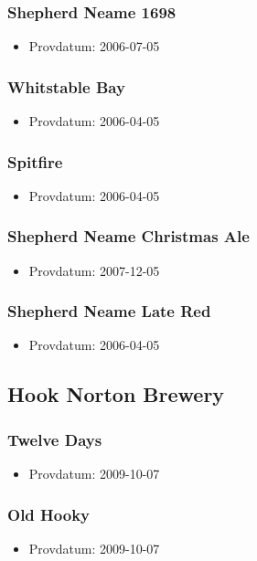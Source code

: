\documentclass[11pt]{article}
\begin{document}
\subsubsection{Shepherd Neame 1698}
\label{sec:org23ca9b9}
\begin{itemize}
\item Provdatum: 2006-07-05
\end{itemize}
\subsubsection{Whitstable Bay}
\label{sec:orgcd83e9d}
\begin{itemize}
\item Provdatum: 2006-04-05
\end{itemize}
\subsubsection{Spitfire}
\label{sec:org556a668}
\begin{itemize}
\item Provdatum: 2006-04-05
\end{itemize}
\subsubsection{Shepherd Neame Christmas Ale}
\label{sec:org135a1e7}
\begin{itemize}
\item Provdatum: 2007-12-05
\end{itemize}
\subsubsection{Shepherd Neame Late Red}
\label{sec:orge764c4f}
\begin{itemize}
\item Provdatum: 2006-04-05
\end{itemize}
\subsection{Hook Norton Brewery}
\label{sec:org47242df}
\subsubsection{Twelve Days}
\label{sec:org99fb584}
\begin{itemize}
\item Provdatum: 2009-10-07
\end{itemize}
\subsubsection{Old Hooky}
\label{sec:org6d6bb32}
\begin{itemize}
\item Provdatum: 2009-10-07
\end{itemize}
\end{document}
